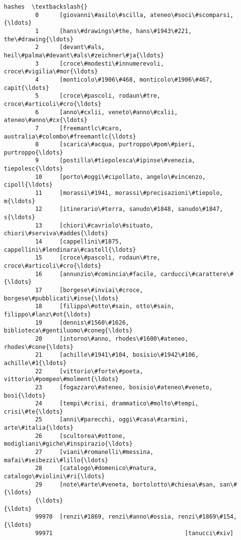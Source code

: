\documentclass[11pt]{article}
\begin{document}
\begin{Verbatim}[commandchars=\\\{\}]
                                                           hashes  \textbackslash{}
         0      [giovanni\#asilo\#scilla, ateneo\#soci\#scomparsi,{\ldots}   
         1      [hans\#drawings\#the, hans\#1943\#221, the\#drawing{\ldots}   
         2      [devant\#als, heil\#palma\#devant\#als\#zeichner\#ja{\ldots}   
         3      [croce\#modesti\#innumerevoli, croce\#vigilia\#mor{\ldots}   
         4      [monticolo\#1906\#468, monticolo\#1906\#467, capit{\ldots}   
         5      [croce\#pascoli, rodaun\#tre, croce\#articoli\#cro{\ldots}   
         6      [anno\#cxlii, veneto\#anno\#cxlii, ateneo\#anno\#cx{\ldots}   
         7      [freemantlc\#caro, australia\#colombo\#freemantlc{\ldots}   
         8      [scarica\#acqua, purtroppo\#pom\#pieri, purtroppo{\ldots}   
         9      [postilla\#tiepolesca\#ipinse\#venezia, tiepolesc{\ldots}   
         10     [porto\#oggi\#cipollato, angelo\#vincenzo, cipoll{\ldots}   
         11     [morassi\#1941, morassi\#precisazioni\#tiepolo, m{\ldots}   
         12     [itinerario\#terra, sanudo\#1848, sanudo\#1847, s{\ldots}   
         13     [chiori\#cavriolo\#situato, chiori\#serviva\#addes{\ldots}   
         14     [cappellini\#1875, cappellini\#lendinara\#castell{\ldots}   
         15     [croce\#pascoli, rodaun\#tre, croce\#articoli\#cro{\ldots}   
         16     [annunzio\#comincia\#facile, carducci\#carattere\#{\ldots}   
         17     [borgese\#inviai\#croce, borgese\#pubblicati\#inse{\ldots}   
         18     [filippo\#otto\#sain, otto\#sain, filippo\#lanz\#ot{\ldots}   
         19     [dennis\#1560\#1626, biblioteca\#gentiluomo\#coneg{\ldots}   
         20     [intorno\#anno, rhodes\#1600\#ateneo, rhodes\#cone{\ldots}   
         21     [achille\#1941\#104, bosisio\#1942\#106, achille\#1{\ldots}   
         22     [vittorio\#forte\#poeta, vittorio\#pompeo\#molment{\ldots}   
         23     [fogazzaro\#ateneo, bosisio\#ateneo\#veneto, bosi{\ldots}   
         24     [tempi\#crisi, drammatico\#molto\#tempi, crisi\#te{\ldots}   
         25     [anni\#parecchi, oggi\#casa\#carmini, arte\#italia{\ldots}   
         26     [scultorea\#ottone, modigliani\#giche\#inspirazio{\ldots}   
         27     [viani\#romanelli\#messina, mafai\#seibezzi\#lillo{\ldots}   
         28     [catalogo\#domenico\#natura, catalogo\#violini\#ri{\ldots}   
         29     [note\#arte\#veneta, bortolotto\#chiesa\#san, san\#{\ldots}   
         {\ldots}                                                  {\ldots}   
         99970  [renzi\#1869, renzi\#anno\#ossia, renzi\#1869\#154,{\ldots}   
         99971                                      [tanucci\#xiv]   

\end{Verbatim}
\end{document}
